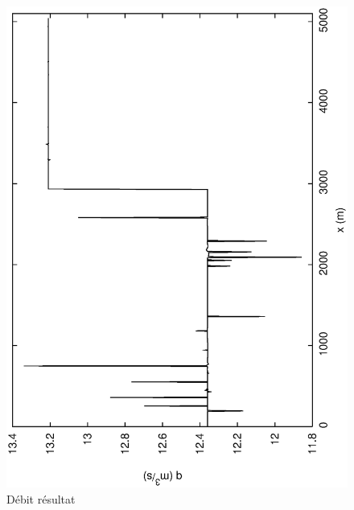 \documentclass[a4paper,10pt]{article}
\begin{document}
\begin{figure}
 \begin{center}
  \includegraphics[angle=270,width=15cm]{Qconv.eps}
  \caption{Débit résultat}
  \label{fig1}
 \end{center}
\end{figure}
\end{document}
